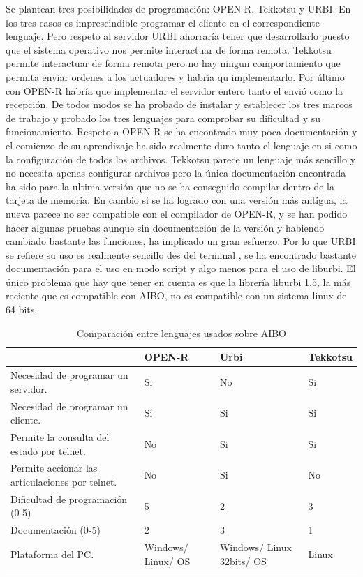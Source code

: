 \documentclass[12pt,a4paper,final,twoside]{book}
\begin{document}
Se plantean tres posibilidades de programación: OPEN-R, Tekkotsu y URBI.
En los tres casos es imprescindible programar el cliente en el correspondiente lenguaje. Pero respeto al servidor URBI ahorraría tener que desarrollarlo puesto que el sistema operativo nos permite interactuar de forma remota. Tekkotsu permite interactuar de forma remota pero no hay ningun comportamiento que permita enviar ordenes a los actuadores y habría qu implementarlo. Por último con OPEN-R habría que implementar el servidor entero tanto el envió como la recepción. 
De todos modos se ha probado de instalar y establecer los tres marcos de trabajo y probado los tres lenguajes para comprobar su dificultad y su funcionamiento. Respeto a OPEN-R se ha encontrado muy poca documentación y el comienzo de su aprendizaje ha sido realmente duro tanto el lenguaje en si como la configuración de todos los archivos. Tekkotsu parece un lenguaje más sencillo y no necesita apenas configurar archivos pero la única documentación encontrada ha sido para la ultima versión que no se ha conseguido compilar dentro de la tarjeta de memoria. En cambio si se ha logrado con una versión más antigua, la nueva parece no ser compatible con el compilador de OPEN-R, y se han podido hacer algunas pruebas aunque sin documentación de la versión y habiendo cambiado bastante las funciones, ha implicado un gran esfuerzo. 
Por lo que URBI se refiere su uso es realmente sencillo des del terminal , se ha encontrado bastante documentación para el uso en modo script y algo menos para el uso de liburbi. El único problema que hay que tener en cuenta es que la librería liburbi 1.5, la más reciente que es compatible con  AIBO, no es compatible con un sistema linux de 64 bits. 

\begin{table}[H]
\begin{center}
\begin{tabulary}{\textwidth}{|p{5cm}|p{2.5cm}|p{2.5cm}|p{2.5cm}|}
\hline

& \textbf{OPEN-R}
& \textbf{Urbi} 
& \textbf{Tekkotsu} \\\hline
Necesidad de programar un servidor.
& Si
& No
& Si \\ \hline
Necesidad de programar un cliente.
& Si
& Si
& Si\\ \hline
Permite la consulta del estado por telnet.
& No
& Si
& Si\\ \hline
Permite accionar las articulaciones por telnet.
& No
& Si
& No\\ \hline
Dificultad de programación (0-5)
& 5
& 2 
& 3\\ \hline
Documentación (0-5)
& 2
& 3
& 1\\ \hline
Plataforma del PC.
& Windows/ Linux/ OS
& Windows/ Linux 32bits/ OS
& Linux\\ \hline
\end{tabulary}
\end{center}
\caption{Comparación entre lenguajes usados sobre AIBO\label{complleng}}
\end{table}
\end{document}
